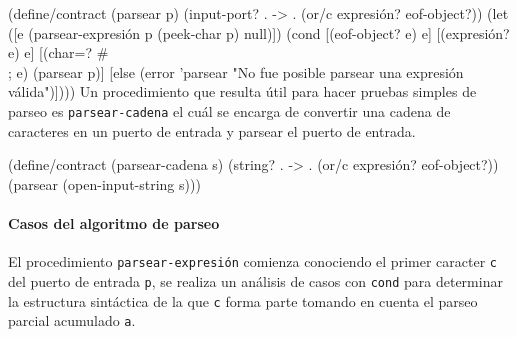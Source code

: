 \documentclass[10pt,oneside,openany,letterpaper]{book}
\begin{document}
\nwenddocs{}\endmoddef
(define/contract (parsear p)
  (input-port? . -> . (or/c expresión? eof-object?))
  (let ([e (parsear-expresión p (peek-char p) null)])
    (cond [(eof-object? e) e]
          [(expresión? e)  e]
          [(char=? #\\; e)  (parsear p)]
          [else
           (error 'parsear "No fue posible parsear una expresión válida")])))
\eatline
{}\nwendcode{}\nwdocspar
Un procedimiento que resulta útil para hacer pruebas simples de parseo es {\tt{}\protect{}parsear\protect{}-cadena} el cuál se encarga de convertir una cadena de caracteres en un puerto de entrada y parsear el puerto de entrada.

\nwenddocs{}\plusendmoddef
(define/contract (parsear-cadena s)
  (string? . -> . (or/c expresión? eof-object?))
  (parsear (open-input-string s)))
\eatline
{}\nwendcode{}\nwdocspar
\paragraph{Casos del algoritmo de parseo} El procedimiento {\tt{}\protect{}parsear\protect{}-expresión} comienza conociendo el primer caracter {\tt{}c} del puerto de entrada {\tt{}p}, se realiza un análisis de casos con {\tt{}cond} para determinar la estructura sintáctica de la que {\tt{}c} forma parte tomando en cuenta el parseo parcial acumulado {\tt{}a}.
\end{document}
